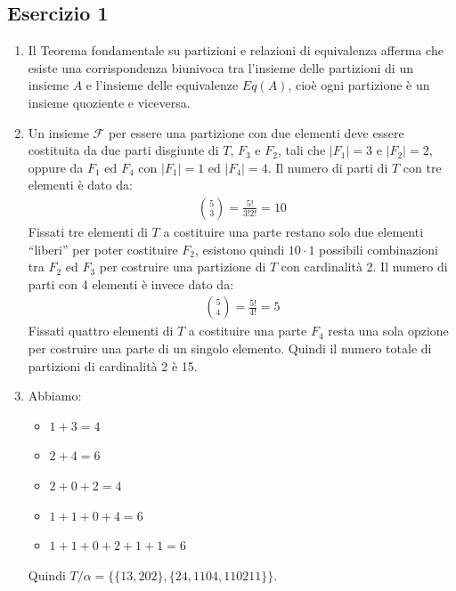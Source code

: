 \subsection*{Esercizio 1}
\begin{enumerate}[label=(\textit{\roman*})]
	\item Il Teorema fondamentale su partizioni e relazioni di equivalenza afferma che esiste una corrispondenza biunivoca tra l'insieme delle partizioni di un insieme $A$ e l'insieme delle equivalenze $Eq(A)$, cioè ogni partizione è un insieme quoziente e viceversa.
	\item Un insieme $\mathcal{F}$ per essere una partizione con due elementi deve essere costituita da due parti disgiunte di $T$, $F_{3}$ e $F_{2}$, tali che $|F_{1}|=3$ e $|F_{2}|=2$, oppure da $F_{1}$ ed $F_{4}$ con $|F_{1}|=1$ ed $|F_{4}|=4$. Il numero di parti di $T$ con tre elementi è dato da:
	\begin{align*}
		\binom{5}{3} = \frac{5!}{3!2!} = 10
	\end{align*}
Fissati tre elementi di $T$ a costituire una parte restano solo due elementi ``liberi'' per poter costituire $F_{2}$, esistono quindi $10 \cdot 1$ possibili combinazioni tra $F_{2}$ ed $F_{3}$ per costruire una partizione di $T$ con cardinalità 2. Il numero di parti con 4 elementi è invece dato da:
\begin{align*}
	\binom{5}{4} = \frac{5!}{4!}= 5
\end{align*}
Fissati quattro elementi di $T$ a costituire una parte $F_{4}$ resta una sola opzione per costruire una parte di un singolo elemento. Quindi il numero totale di partizioni di cardinalità 2 è 15.
\item Abbiamo:
\begin{itemize}
	\item $1+3=4$
	\item $2+4=6$
	\item $2+0+2=4$
	\item $1+1+0+4=6$
	\item $1+1+0+2+1+1=6$
\end{itemize}
Quindi $T/{\alpha}=\{\{13,202\},\{24,1104,110211\}\}$.
	\end{enumerate}

